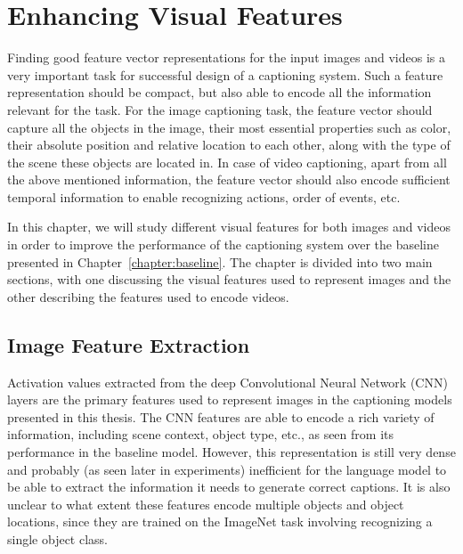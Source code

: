 \chapter{Enhancing Visual Features}
\label{chapter:VisFeatChapter}

Finding good feature vector representations for the input images and videos is a
very important task for successful design of a captioning system.
Such a feature representation should be compact, but also able to encode all the
information relevant for the task. 
For the image captioning task, the feature vector should capture all the objects in
the image, their most essential properties such as color, their absolute
position and relative location to each other, along with the type of the scene
these objects are located in.
In case of video captioning, apart from all the above mentioned information, the
feature vector should also encode sufficient temporal information to enable
recognizing actions, order of events, etc.

In this chapter, we will study different visual features for both images and
videos in order to improve the performance of the captioning system over the
baseline presented in Chapter~\ref{chapter:baseline}.
The chapter is divided into two main sections, with one discussing the visual
features used to represent images and the other describing the features used to
encode videos.

\section{Image Feature Extraction}
\label{sec:ImageFeat}

Activation values extracted from the deep Convolutional Neural Network (CNN)
layers are the primary features used to represent images in the captioning
models presented in this thesis.
The CNN features are able to encode a rich variety of information, including
scene context, object type, etc.\@, as seen from its performance in the baseline
model.
However, this representation is still very dense and probably (as seen later in
experiments) inefficient for the language model to be able to extract the
information it needs to generate correct captions.
It is also unclear to what extent these features encode multiple objects and
object locations, since they are trained on the ImageNet task involving
recognizing a single object class.

